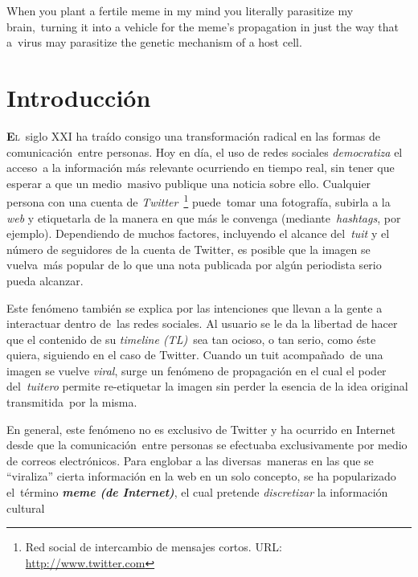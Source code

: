 \begin{savequote}[45mm]
  When you plant a fertile meme in my mind you literally parasitize my brain,\
  turning it into a vehicle for the meme's propagation in just the way that a\
  virus may parasitize the genetic mechanism of a host cell.
  \qauthor{Richard Dawkins \cite{dawkins2006}}
\end{savequote}

\chapter{Introducción}

\noindent
\lettrine[lines=2, lhang=0.33, loversize=0.25]{\textbf{E}}{l}\
siglo XXI ha traído consigo una transformación radical en las formas de comunicación\
entre personas. Hoy en día, el uso de redes sociales \emph{democratiza} el acceso\
a la información más relevante ocurriendo en tiempo real, sin tener que esperar a que un medio\
masivo publique una noticia sobre ello. Cualquier persona con una cuenta de \textit{Twitter}\
\footnote{Red social de intercambio de mensajes cortos. URL: \url{http://www.twitter.com}} puede\
tomar una fotografía, subirla a la \textit{web} y etiquetarla de la manera en que más le convenga (mediante\
\textit{hashtags}, por ejemplo). Dependiendo de muchos factores, incluyendo el alcance del\
\textit{tuit} y el número de seguidores de la cuenta de Twitter, es posible que la imagen se vuelva\
más popular de lo que una nota publicada por algún periodista serio pueda alcanzar.\par
Este fenómeno también se explica por las intenciones que llevan a la gente a interactuar dentro de\
las redes sociales. Al usuario se le da la libertad de hacer que el contenido de su \textit{timeline (TL)}\
sea tan ocioso, o tan serio, como éste quiera, siguiendo en el caso de Twitter. Cuando un tuit acompañado\
de una imagen se vuelve \emph{viral}, surge un fenómeno de propagación en el cual el poder del\
\textit{tuitero} permite re-etiquetar la imagen sin perder la esencia de la idea original transmitida\
por la misma.\par
En general, este fenómeno no es exclusivo de Twitter y ha ocurrido en Internet desde que la comunicación\
entre personas se efectuaba exclusivamente por medio de correos electrónicos. Para englobar a las diversas\
maneras en las que se ``viraliza'' cierta información en la web en un solo concepto, se ha popularizado el\
término \emph{\textbf{meme (de Internet)}}, el cual pretende \emph{discretizar} la información cultural\
